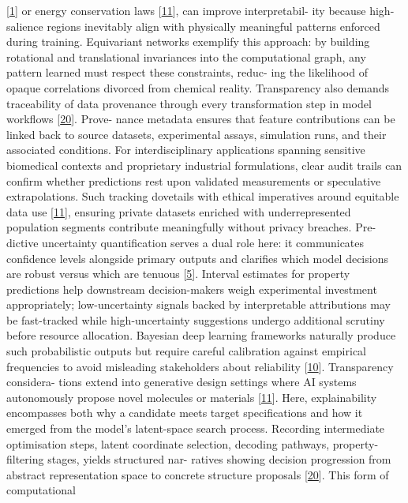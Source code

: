 \documentclass[
]{article}
\begin{document}
{[}\hyperref[_bookmark41]{1}{]} or energy conservation laws
{[}\hyperref[_bookmark51]{11}{]}, can improve interpretabil- ity because
high-salience regions inevitably align with physically meaningful
patterns enforced during training. Equivariant networks exemplify this
approach: by building rotational and translational invariances into the
computational graph, any pattern learned must respect these constraints,
reduc- ing the likelihood of opaque correlations divorced from chemical
reality. Transparency also demands traceability of data provenance
through every transformation step in model workflows
{[}\hyperref[_bookmark60]{20}{]}. Prove- nance metadata ensures that
feature contributions can be linked back to source datasets,
experimental assays, simulation runs, and their associated conditions.
For interdisciplinary applications spanning sensitive biomedical
contexts and proprietary industrial formulations, clear audit trails can
confirm whether predictions rest upon validated measurements or
speculative extrapolations. Such tracking dovetails with ethical
imperatives around equitable data use {[}\hyperref[_bookmark51]{11}{]},
ensuring private datasets enriched with underrepresented population
segments contribute meaningfully without privacy breaches. Pre- dictive
uncertainty quantification serves a dual role here: it communicates
confidence levels alongside primary outputs and clarifies which model
decisions are robust versus which are tenuous
{[}\hyperref[_bookmark45]{5}{]}. Interval estimates for property
predictions help downstream decision-makers weigh experimental
investment appropriately; low-uncertainty signals backed by
interpretable attributions may be fast-tracked while high-uncertainty
suggestions undergo additional scrutiny before resource allocation.
Bayesian deep learning frameworks naturally produce such probabilistic
outputs but require careful calibration against empirical frequencies to
avoid misleading stakeholders about reliability
{[}\hyperref[_bookmark50]{10}{]}. Transparency considera- tions extend
into generative design settings where AI systems autonomously propose
novel molecules or materials {[}\hyperref[_bookmark51]{11}{]}. Here,
explainability encompasses both why a candidate meets target
specifications and how it emerged from the model's latent-space search
process. Recording intermediate optimisation steps, latent coordinate
selection, decoding pathways, property-filtering stages, yields
structured nar- ratives showing decision progression from abstract
representation space to concrete structure proposals
{[}\hyperref[_bookmark60]{20}{]}. This form of computational
\end{document}
